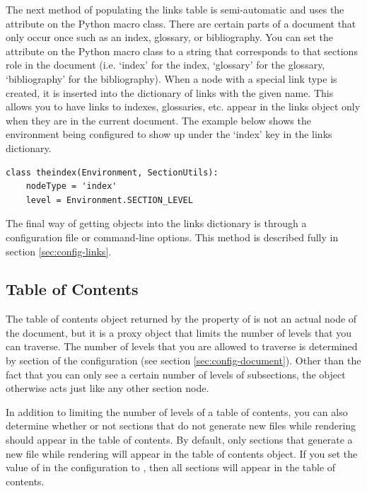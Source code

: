 The next method of populating the links table is semi-automatic and uses
the  attribute on the Python macro class.  There are 
certain parts of a document that only occur once such as an index, 
glossary, or bibliography.  You can set the  attribute
on the Python macro class to a string that corresponds to that sections 
role in the document (i.e. `index' for the index, `glossary' for the glossary,
`bibliography' for the bibliography).  When a node with a special link
type is created, it is inserted into the dictionary of links with the 
given name.  This allows you to have links to indexes, glossaries, etc.
appear in the links object only when they are in the current document.
The example below shows the  environment being
configured to show up under the `index' key in the links dictionary.
\begin{verbatim}
class theindex(Environment, SectionUtils):
    nodeType = 'index'
    level = Environment.SECTION_LEVEL
\end{verbatim}

The final way of getting objects into the links dictionary is through 
a configuration file or command-line options.  This method is described
fully in section \ref{sec:config-links}.


\subsection{Table of Contents\label{sec:tableofcontents}}

The table of contents object returned by the 
property of  is not an actual node of the document,
but it is a proxy object that limits the number of levels that you can
traverse.  The number of levels that you are allowed to traverse is
determined by  section of the configuration
(see section \ref{sec:config-document}).  Other than the fact that you
can only see a certain number of levels of subsections, the object 
otherwise acts just like any other section node.

In addition to limiting the number of levels of a table of contents,
you can also determine whether or not sections that do not generate new
files while rendering should appear in the table of contents.  By
default, only sections that generate a new file while rendering will
appear in the table of contents object.  If you set the value of
 in the configuration to ,
then all sections will appear in the table of contents.



